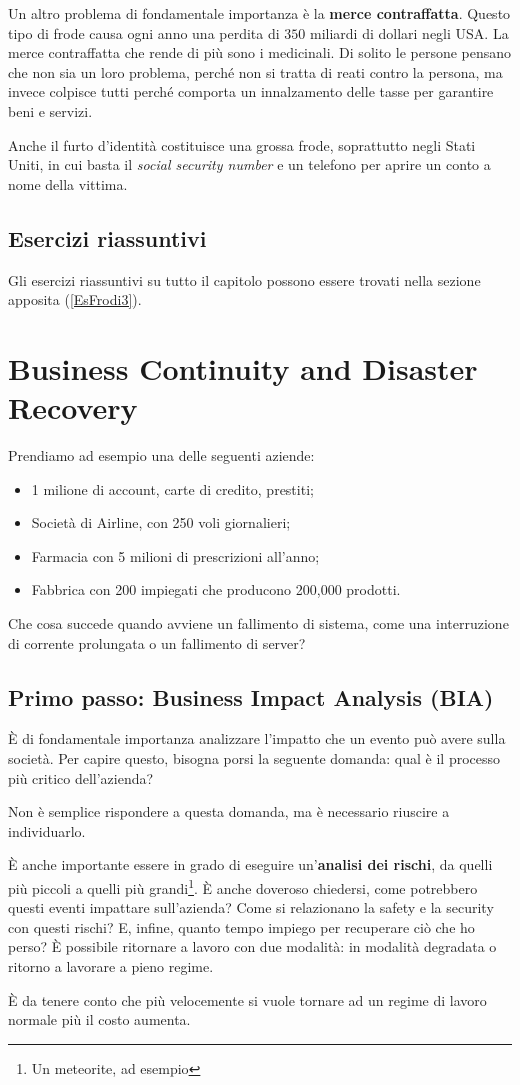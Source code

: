 Un altro problema di fondamentale importanza è la \textbf{merce
contraffatta}.
Questo tipo di frode causa ogni anno una perdita
di $350$ miliardi di dollari negli USA.
La merce contraffatta che rende di più sono i medicinali.
Di solito le persone pensano che non sia un loro problema,
perché non si tratta di reati contro la persona, ma
invece colpisce tutti perché comporta un innalzamento delle tasse
per garantire beni e servizi.


Anche il furto d'identità costituisce una grossa frode, soprattutto negli
Stati Uniti, in cui basta il \emph{social security number} e un telefono per
aprire un conto a nome della vittima.

\section{Esercizi riassuntivi}

Gli esercizi riassuntivi su tutto il capitolo possono essere trovati nella
sezione apposita (\ref{EsFrodi3}).




\chapter{Business Continuity and Disaster Recovery}
\label{BCDR}

Prendiamo ad esempio una delle seguenti aziende:
\begin{itemize}
  \item 1 milione di account, carte di credito, prestiti;
  \item Società di Airline, con 250 voli giornalieri;
  \item Farmacia con 5 milioni di prescrizioni all'anno;
  \item Fabbrica con 200 impiegati che producono 200,000 prodotti.
\end{itemize}

Che cosa succede quando avviene un fallimento di sistema, come una interruzione
di corrente prolungata o un fallimento di server?

\section{Primo passo: Business Impact Analysis (BIA)}

È di fondamentale importanza analizzare l'impatto che un evento può avere sulla
società. Per capire questo, bisogna porsi la seguente domanda: qual è il
processo più critico dell'azienda?

Non è semplice rispondere a questa domanda, ma è necessario riuscire a
individuarlo.

È anche importante essere in grado di eseguire un'\textbf{analisi dei rischi},
da quelli più piccoli a quelli più grandi\footnote{Un meteorite, ad esempio}. È
anche doveroso chiedersi, come potrebbero questi eventi impattare sull'azienda?
Come si relazionano la safety e la security con questi rischi? E, infine,
quanto tempo impiego per recuperare ciò che ho perso? È possibile ritornare a
lavoro con due modalità: in modalità degradata o ritorno a lavorare a pieno
regime.

È da tenere conto che più velocemente si vuole tornare ad un regime di lavoro
normale più il costo aumenta.
